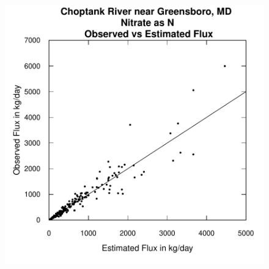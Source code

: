 \documentclass[a4paper,11pt]{article}
\begin{document}
\begin{figure}[htbp]
  \begin{minipage}[h]{0.5\linewidth}
    \begin{center}

\includegraphics{EGRET-figplotFluxPred}
    \label{fig:plotFluxPred}
    \end{center}
  \end{minipage}
  \hspace{0.5cm}
  \begin{minipage}[h]{0.5\linewidth}
    \begin{center}



\end{center}
\end{minipage}
\end{figure}
\end{document}
